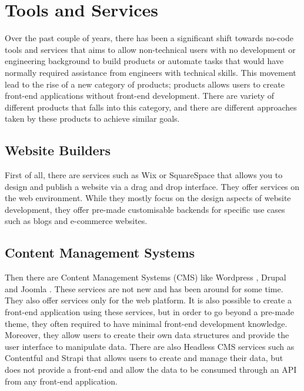 
\section{Tools and Services} \label{relatedTools}

Over the past couple of years, there has been a significant shift towards no-code tools and services that aims to allow non-technical users with no development or engineering background to build products or automate tasks that would have normally required assistance from engineers with technical skills. This movement lead to the rise of a new category of products; products allows users to create front-end applications without front-end development. There are variety of different products that falls into this category, and there are different approaches taken by these products to achieve similar goals.

\subsection{Website Builders}

First of all, there are services such as Wix \cite{Wix} or SquareSpace \cite{SquareSpace} that allows you to design and publish a website via a drag and drop interface. They offer services on the web environment. While they mostly focus on the design aspects of website development, they offer pre-made customisable backends for specific use cases such as blogs and e-commerce websites.

\subsection{Content Management Systems}

Then there are Content Management Systems (CMS) like Wordpress \cite{Wordpress}, Drupal \cite{Drupal} and Joomla \cite{Joomla}. These services are not new and has been around for some time. They also offer services only for the web platform. It is also possible to create a front-end application using these services, but in order to go beyond a pre-made theme, they often required to have minimal front-end development knowledge. Moreover, they allow users to create their own data structures and provide the user interface to manipulate data. There are also Headless CMS services such as Contentful \cite{Contentful} and Strapi \cite{Strapi} that allows users to create and manage their data, but does not provide a front-end and allow the data to be consumed through an API from any front-end application.

